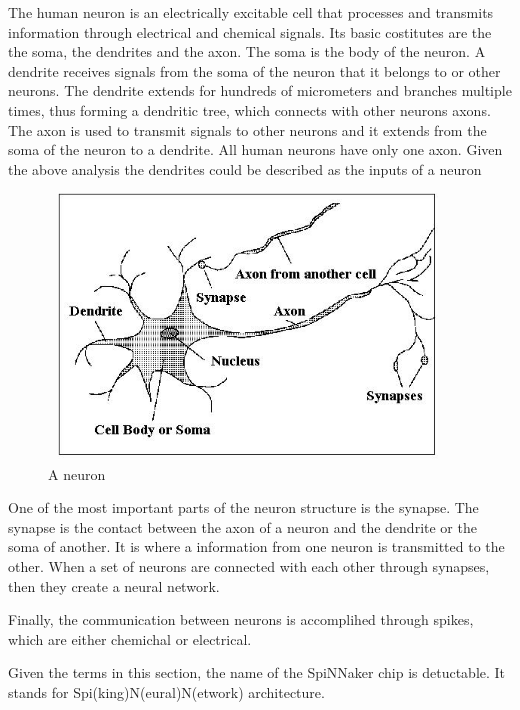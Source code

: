 \documentclass[12pt,a4paper]{article}
\begin{document}
The human neuron is an electrically excitable cell that processes and transmits information through electrical and chemical signals. Its basic costitutes are the the soma, the dendrites and the axon. The soma is the body of the neuron. A dendrite receives signals from the soma of the neuron that it belongs to or other neurons. The dendrite extends for hundreds of micrometers and branches multiple times, thus forming a dendritic tree, which connects with other neurons axons. The axon is used to transmit signals to other neurons and it extends from the soma of the neuron to a dendrite. All human neurons have only one axon. Given the above analysis the dendrites could be described as the inputs of a neuron
\\[0.5cm]
\begin{figure}[h!]
\includegraphics[width=300pt,height=200pt,scale=2]{Pics/neuron.jpg}
\centering
\caption{A neuron}
\end{figure}

One of the most important parts of the neuron structure is the synapse. The synapse is the contact between the axon of a neuron and the dendrite or the soma of another. It is where a information from one neuron is transmitted to the other. When a set of neurons are connected with each other through synapses, then they create a neural network.

Finally, the communication between neurons is accomplihed through spikes, which are either chemichal or electrical\cite{gerstner2002spiking}.

Given the terms in this section, the name of the SpiNNaker chip is detuctable. It stands for Spi(king)N(eural)N(etwork) architecture.
\end{document}
